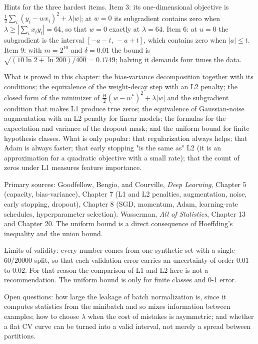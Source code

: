 \begin{latihan}
Hints for the three hardest items. Item 3: its one-dimensional objective is
$\frac12\sum_i(y_i-wx_i)^2+\lambda|w|$; at $w=0$ its subgradient contains zero when
$\lambda\ge|\sum_ix_iy_i|=64$, so that $w=0$ exactly at $\lambda=64$. Item 6: at $u=0$
the subgradient is the interval $[-a-t,\,-a+t]$, which contains zero when $|a|\le t$.
Item 9: with $m=2^{10}$ and $\delta=0.01$ the bound is
$\sqrt{(10\ln2+\ln200)/400}=0.1749$; halving it demands four times the data.
\end{latihan}

\begin{untukpeneliti}
What is proved in this chapter: the bias-variance decomposition together with its
conditions; the equivalence of the weight-decay step with an L2 penalty; the closed form
of the minimizer of $\frac H2(w-w^\ast)^2+\lambda|w|$ and the subgradient condition that
makes L1 produce true zeros; the equivalence of Gaussian-noise augmentation with an L2
penalty for linear models; the formulas for the expectation and variance of the dropout
mask; and the uniform bound for finite hypothesis classes. What is only popular: that
regularization always helps; that Adam is always faster; that early stopping "is the
same as" L2 (it is an approximation for a quadratic objective with a small rate); that
the count of zeros under L1 measures feature importance.

Primary sources: Goodfellow, Bengio, and Courville, \emph{Deep Learning}, Chapter 5
(capacity, bias-variance), Chapter 7 (L1 and L2 penalties, augmentation, noise, early
stopping, dropout), Chapter 8 (SGD, momentum, Adam, learning-rate schedules,
hyperparameter selection). Wasserman, \emph{All of Statistics}, Chapter 13 and Chapter 20.
The uniform bound is a direct consequence of Hoeffding's inequality and the union bound.

Limits of validity: every number comes from one synthetic set with a single $60/20000$
split, so that each validation error carries an uncertainty of order $0.01$ to $0.02$.
For that reason the comparison of L1 and L2 here is not a recommendation. The uniform
bound is only for finite classes and 0-1 error.

Open questions: how large the leakage of batch normalization is, since it computes
statistics from the minibatch and so mixes information between examples; how to choose
$\lambda$ when the cost of mistakes is asymmetric; and whether a flat CV curve can be
turned into a valid interval, not merely a spread between partitions.
\end{untukpeneliti}

